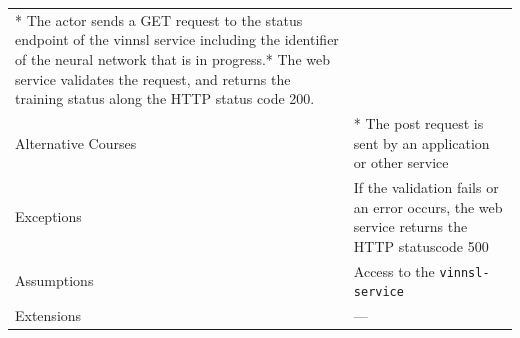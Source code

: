 \begin{longtable}[]{@{}ll@{}}
\begin{minipage}[t]{0.68\columnwidth}
* The actor sends a GET request to the status endpoint of the vinnsl
service including the identifier of the neural network that is in
progress.* The web service validates the request, and returns the
training status along the HTTP status code 200.\strut
\end{minipage}\tabularnewline
\begin{minipage}[t]{0.27\columnwidth}\raggedright\strut
Alternative Courses\strut
\end{minipage} & \begin{minipage}[t]{0.68\columnwidth}\raggedright\strut
* The post request is sent by an application or other service\strut
\end{minipage}\tabularnewline
\begin{minipage}[t]{0.27\columnwidth}\raggedright\strut
Exceptions\strut
\end{minipage} & \begin{minipage}[t]{0.68\columnwidth}\raggedright\strut
If the validation fails or an error occurs, the web service returns the
HTTP statuscode 500\strut
\end{minipage}\tabularnewline
\begin{minipage}[t]{0.27\columnwidth}\raggedright\strut
Assumptions\strut
\end{minipage} & \begin{minipage}[t]{0.68\columnwidth}\raggedright\strut
Access to the \texttt{vinnsl-service}\strut
\end{minipage}\tabularnewline
\begin{minipage}[t]{0.27\columnwidth}\raggedright\strut
Extensions\strut
\end{minipage} & \begin{minipage}[t]{0.68\columnwidth}\raggedright\strut
---\strut
\end{minipage}\tabularnewline
\bottomrule
\end{longtable}

